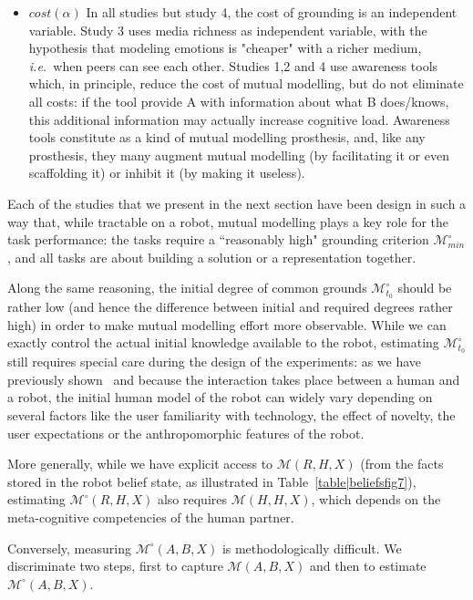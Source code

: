 \documentclass[twocolumn]{article}
\newcommand{\ie}{{\textit{i.e.\ }}}
\newcommand{\model}[3]{{$\mathcal{M}(#1, #2, #3)$}}
\newcommand{\Model}[3]{{$\mathcal{M}^{\circ}(#1, #2, #3)$}}
\newcommand{\groundingcriterion}{{$\mathcal{M}^{\circ}_{min}$}}
\newcommand{\inigrounding}{{$\mathcal{M}^{\circ}_{t_0}$}}
\begin{document}
\begin{itemize}
    \item $cost(\alpha)$ In all studies but study 4, the cost of  grounding is
        an independent variable. Study 3 uses media richness as independent
        variable, with the hypothesis that modeling emotions is "cheaper" with a
        richer medium, \ie  when peers can see each other.  Studies 1,2 and 4
        use awareness tools which, in principle, reduce the cost of mutual modelling, but do
        not eliminate all costs: if the tool provide A with information about
        what B does/knows, this additional information may actually increase
        cognitive load. Awareness tools constitute as a kind of mutual modelling prosthesis,
        and, like any prosthesis, they many augment mutual modelling (by facilitating it or
        even scaffolding it) or inhibit it (by making it useless).

\end{itemize}


Each of the studies that we present in the next section have been design in such a way that, while tractable on a
robot, mutual modelling plays a key role for the task performance: the tasks
require a ``reasonably high" grounding criterion \groundingcriterion,
and all tasks are about building a solution or a representation together.

Along the same reasoning, the initial degree of common grounds \inigrounding
should be rather low (and hence the difference between initial and required
degrees rather high) in order to make mutual modelling effort more observable.
While we can exactly control the actual initial knowledge available to the
robot, estimating \inigrounding still requires special care during the design of
the experiments: as we have previously shown~\cite{lemaignan2014dynamics,
lemaignan2014cognitive} and because the interaction takes place between a human and
a robot, the initial human model of the robot can widely vary depending on
several factors like the user familiarity with technology, the effect of
novelty, the user expectations or the anthropomorphic features of the robot.

More generally, while we have explicit access to \model{R}{H}{X} (from the facts
stored in the robot belief state, as illustrated in
Table~\ref{table|beliefsfig7}), estimating \Model{R}{H}{X} also requires
\model{H}{H}{X}, which depends on the meta-cognitive competencies of the human
partner.

Conversely, measuring \Model{A}{B}{X} is methodologically difficult. We
discriminate two steps, first to capture \model{A}{B}{X} and then to
estimate \Model{A}{B}{X}. 
\end{document}
